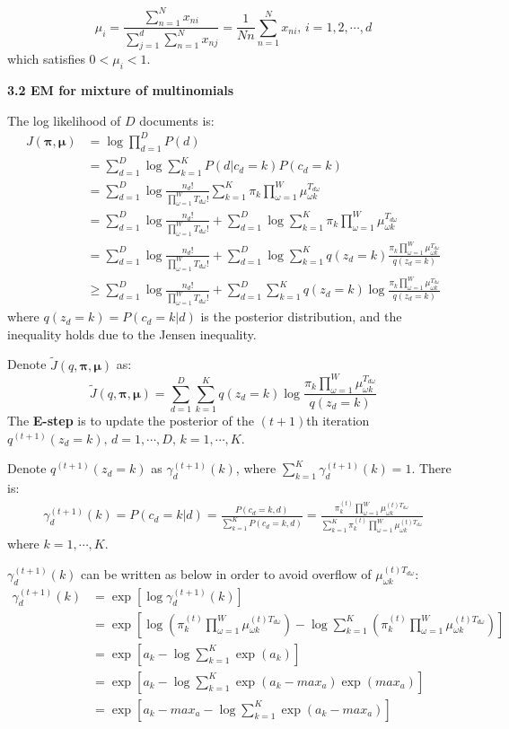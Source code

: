 \documentclass[12pt]{article}
\begin{document}
$$\mu_i=\frac{\sum_{n=1}^N x_{ni}}{\sum_{j=1}^d\sum_{n=1}^N x_{nj}}=\frac{1}{Nn}\sum_{n=1}^N x_{ni},\,i=1,2,\cdots,d$$
which satisfies $0<\mu_i<1$.
\par
\bigskip
{\bf 3.2 EM for mixture of multinomials}
\par
The log likelihood of $D$ documents is:
\begin{align*}
J(\bm{\pi},\bm{\mu})&=\log\prod_{d=1}^D P(d)\\
&=\sum_{d=1}^D\log\sum_{k=1}^K P(d|c_d=k)P(c_d=k)\\
&=\sum_{d=1}^D\log\frac{n_d!}{\prod_{\omega=1}^WT_{d\omega}!}\sum_{k=1}^K\pi_k\prod_{\omega=1}^W\mu_{\omega k}^{T_{d\omega}}\\
&=\sum_{d=1}^D\log\frac{n_d!}{\prod_{\omega=1}^WT_{d\omega}!}+\sum_{d=1}^D\log\sum_{k=1}^K\pi_k\prod_{\omega=1}^W\mu_{\omega k}^{T_{d\omega}}\\
&=\sum_{d=1}^D\log\frac{n_d!}{\prod_{\omega=1}^WT_{d\omega}!}+\sum_{d=1}^D\log\sum_{k=1}^K q(z_d=k)\frac{\pi_k\prod_{\omega=1}^W\mu_{\omega k}^{T_{d\omega}}}{q(z_d=k)}\\
&\geq \sum_{d=1}^D\log\frac{n_d!}{\prod_{\omega=1}^WT_{d\omega}!}+\sum_{d=1}^D\sum_{k=1}^K q(z_d=k)\log\frac{\pi_k\prod_{\omega=1}^W\mu_{\omega k}^{T_{d\omega}}}{q(z_d=k)}
\end{align*}
where $q(z_d=k)=P(c_d=k|d)$ is the posterior distribution, and the inequality holds due to the Jensen inequality.
\par
Denote $\tilde{J}(q,\bm{\pi},\bm{\mu})$ as:
$$\tilde{J}(q,\bm{\pi},\bm{\mu})=\sum_{d=1}^D\sum_{k=1}^K q(z_d=k)\log\frac{\pi_k\prod_{\omega=1}^W\mu_{\omega k}^{T_{d\omega}}}{q(z_d=k)}$$
The {\bf E-step} is to update the posterior of the $(t+1)$th iteration $q^{(t+1)}(z_d=k),\,d=1,\cdots,D,\,k=1,\cdots,K$. 
\par 
Denote $q^{(t+1)}(z_d=k)$ as $\gamma_d^{(t+1)}(k)$, where $\sum_{k=1}^K\gamma_d^{(t+1)}(k)=1$. There is:
\begin{align*}
\gamma_d^{(t+1)}(k)=P(c_d=k|d)=\frac{P(c_d=k,d)}{\sum_{k=1}^K P(c_d=k,d)}=\frac{\pi_k^{(t)}\prod_{\omega=1}^W\mu_{\omega k}^{(t)T_{d\omega}}}{\sum_{k=1}^K\pi_k^{(t)}\prod_{\omega=1}^W\mu_{\omega k}^{(t)T_{d\omega}}}
\end{align*}
where $k=1,\cdots,K$.
\par
$\gamma_d^{(t+1)}(k)$ can be written as below in order to avoid overflow of $\mu_{\omega k}^{(t)T_{d\omega}}$:
\begin{align*}
\gamma_d^{(t+1)}(k)&=\exp\left[\log\gamma_d^{(t+1)}(k)\right]\\
&=\exp\left[\log\left(\pi_k^{(t)}\prod_{\omega=1}^W\mu_{\omega k}^{(t)T_{d\omega}}\right)-\log\sum_{k=1}^K\left(\pi_k^{(t)}\prod_{\omega=1}^W\mu_{\omega k}^{(t)T_{d\omega}}\right)\right]\\
&=\exp\left[a_k-\log\sum_{k=1}^K\exp\left(a_k\right)\right]\\
&=\exp\left[a_k-\log\sum_{k=1}^K\exp\left(a_k-max_a\right)\exp\left(max_a\right)\right]\\
&=\exp\left[a_k-max_a-\log\sum_{k=1}^K\exp\left(a_k-max_a\right)\right]
\end{align*}
\end{document}
